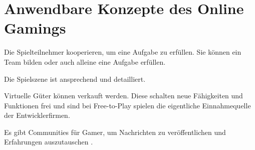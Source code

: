 \section{Anwendbare Konzepte des Online Gamings}

Die Spielteilnehmer kooperieren, um eine Aufgabe zu erfüllen. Sie können ein Team bilden oder auch alleine eine Aufgabe erfüllen.

Die Spielszene ist ansprechend und detailliert.

Virtuelle Güter können verkauft werden. Diese schalten neue Fähigkeiten und Funktionen frei und sind bei Free-to-Play spielen die eigentliche Einnahmequelle der Entwicklerfirmen.

Es gibt Communities für Gamer, um Nachrichten zu veröffentlichen und Erfahrungen auszutauschen \parencite[S. 126]{warmelink}.
